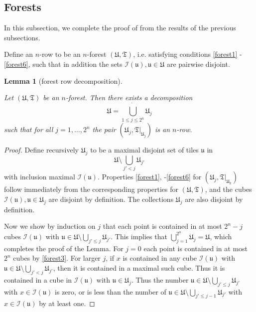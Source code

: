 \documentclass[10pt,a4paper]{article}
\theoremstyle{plain}
\newtheorem{lemma}[theorem]{Lemma}
\theoremstyle{definition}
\numberwithin{equation}{subsection}
\newcommand{\fu}{{\mathfrak u}}
\newcommand{\fU}{{\mathfrak U}}
\newcommand{\fT}{{\mathfrak T}}
\newcommand{\scI}{{\mathcal{I}}} %
\newcommand{\lean}[1]{}
\newcommand{\leanok}{}
\begin{document}
\subsection{Forests}
In this subsection, we complete the proof of  from the results of the previous subsections.

Define an $n$-row to be an $n$-forest $(\fU, \fT)$, i.e. satisfying conditions \eqref{forest1} - \eqref{forest6}, such that in addition the sets $\scI(\fu), \fu \in \fU$ are pairwise disjoint.

\begin{lemma}[forest row decomposition]
    \label{forest-row-decomposition}
    \leanok
    \lean{TileStructure.Forest.rowDecomp, TileStructure.Forest.biUnion_rowDecomp,
    TileStructure.Forest.pairwiseDisjoint_rowDecomp}
    Let $(\fU, \fT)$ be an $n$-forest. Then there exists a decomposition
    $$
        \fU = \dot{\bigcup_{1 \le j \le 2^n}} \fU_j
    $$
    such that for all $j = 1, \dotsc, 2^n$ the pair $(\fU_j, \fT|_{\fU_j})$ is an $n$-row.
\end{lemma}

\begin{proof}
    \leanok
    Define recursively $\fU_j$ to be a maximal disjoint set of tiles $\fu$ in
    $$
        \fU \setminus \bigcup_{j' < j} \fU_{j'}
    $$
    with inclusion maximal $\scI(\fu)$. Properties \eqref{forest1}, -\eqref{forest6} for $(\fU_j, \fT|_{\fU_k})$ follow immediately from the corresponding properties for $(\fU, \fT)$, and the cubes $\scI(\fu), \fu \in \fU_j$ are disjoint by definition. The collections $\fU_j$ are also disjoint by definition.

    Now we show by induction on $j$ that each point is contained in at most $2^n - j$ cubes $\scI(\fu)$ with $\fu \in \fU \setminus \bigcup_{j' \le j} \fU_{j'}$. This implies that $\bigcup_{j = 1}^{2^n} \fU_j = \fU$, which completes the proof of the Lemma. For $j = 0$ each point is contained in at most $2^n$ cubes by \eqref{forest3}. For larger $j$, if $x$ is contained in any cube $\scI(\fu)$ with $\fu \in \fU \setminus \bigcup_{j' < j} \fU_{j'}$, then it is contained in a maximal such cube. Thus it is contained in a cube in $\scI(\fu)$ with $\fu \in \fU_j$. Thus the number $\fu \in \fU \setminus \bigcup_{j' \le j} \fU_{j'}$ with $x\in \scI(\fu)$ is zero, or is less than the number of $\fu \in \fU \setminus \bigcup_{j' \le j-1} \fU_{j'}$ with $x \in \scI(\fu)$ by at least one.
\end{proof}
\end{document}
